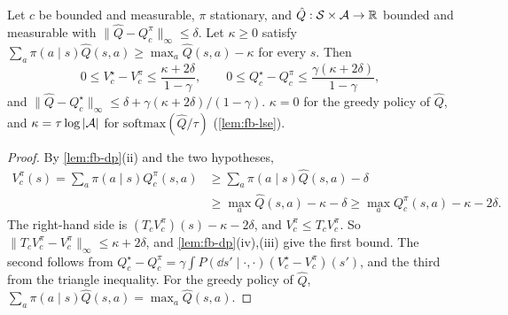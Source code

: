 \begin{lemma}\label{lem:fb-softgreedy}
Let $c$ be bounded and measurable, $\pi$ stationary, and $\hat Q:\mathcal{S}\times\mathcal{A}\to\mathbb{R}$ bounded and measurable with $\|\hat Q-Q^\pi_c\|_\infty\le\delta$.
Let $\kappa\ge0$ satisfy $\sum_a\pi(a\mid s)\hat Q(s,a)\ge\max_a\hat Q(s,a)-\kappa$ for every $s$. Then
\[
0\le V^\star_c-V^\pi_c\le\frac{\kappa+2\delta}{1-\gamma},\qquad
0\le Q^\star_c-Q^\pi_c\le\frac{\gamma(\kappa+2\delta)}{1-\gamma},
\]
and $\|\hat Q-Q^\star_c\|_\infty\le\delta+\gamma(\kappa+2\delta)/(1-\gamma)$.
$\kappa=0$ for the greedy policy of $\hat Q$, and $\kappa=\tau\log|\mathcal{A}|$ for $\mathrm{softmax}(\hat Q/\tau)$ (\cref{lem:fb-lse}).
\end{lemma}
\begin{proof}
By \cref{lem:fb-dp}(ii) and the two hypotheses,
\begin{align*}
V^\pi_c(s)=\sum_a\pi(a\mid s)Q^\pi_c(s,a)&\ge\sum_a\pi(a\mid s)\hat Q(s,a)-\delta\\
&\ge\max_a\hat Q(s,a)-\kappa-\delta\ge\max_aQ^\pi_c(s,a)-\kappa-2\delta .
\end{align*}
The right-hand side is $(T_cV^\pi_c)(s)-\kappa-2\delta$, and $V^\pi_c\le T_cV^\pi_c$.
So $\|T_cV^\pi_c-V^\pi_c\|_\infty\le\kappa+2\delta$, and \cref{lem:fb-dp}(iv),(iii) give the first bound.
The second follows from $Q^\star_c-Q^\pi_c=\gamma\int P(\dd s'\mid\cdot,\cdot)(V^\star_c-V^\pi_c)(s')$, and the third from the triangle inequality.
For the greedy policy of $\hat Q$, $\sum_a\pi(a\mid s)\hat Q(s,a)=\max_a\hat Q(s,a)$.
\end{proof}

